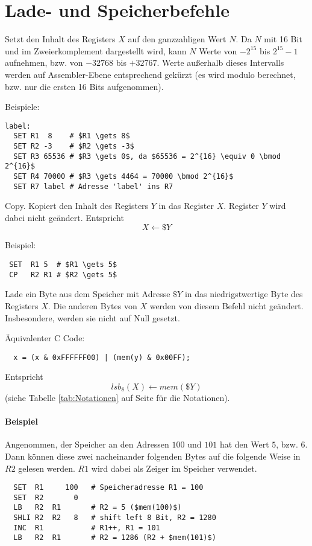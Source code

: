 \section{Lade- und Speicherbefehle}
\label{sec:Lade-Speicher-Instruktionen}

Setzt den Inhalt des Registers $X$ auf den ganzzahligen Wert $N$.
Da $N$ mit 16 Bit und im Zweierkomplement dargestellt wird, kann $N$ Werte von
$-2^{15}$ bis $2^{15} - 1$ aufnehmen, bzw. von $-32768$ bis $+32767$.
Werte außerhalb dieses Intervalls werden auf Assembler-Ebene entsprechend
gekürzt (es wird modulo berechnet, bzw. nur die ersten 16 Bits aufgenommen).

Beispiele:
\begin{lstlisting}
label:
  SET R1  8    # $R1 \gets 8$
  SET R2 -3    # $R2 \gets -3$
  SET R3 65536 # $R3 \gets 0$, da $65536 = 2^{16} \equiv 0 \bmod 2^{16}$
  SET R4 70000 # $R3 \gets 4464 = 70000 \bmod 2^{16}$
  SET R7 label # Adresse 'label' ins R7
\end{lstlisting}


\glqq Copy\grqq.
Kopiert den Inhalt des Registers $Y$ in das Register $X$. Register $Y$ wird
dabei nicht geändert. Entspricht
\[
    X \gets \$Y
\]

Beispiel:
\begin{lstlisting}
 SET  R1 5  # $R1 \gets 5$
 CP   R2 R1 # $R2 \gets 5$
\end{lstlisting}



Lade ein Byte aus dem Speicher mit Adresse $\$Y$ in das niedrigstwertige
Byte des Registers $X$. Die anderen Bytes von $X$ werden von diesem Befehl nicht
geändert. Insbesondere, werden sie nicht auf Null gesetzt.

Äquivalenter C Code:
\begin{lstlisting}
  x = (x & 0xFFFFFF00) | (mem(y) & 0x00FF);
\end{lstlisting}

Entspricht 
\[
  lsb_{8}(X) \gets mem(\$Y)
\]
(siehe Tabelle \ref{tab:Notationen} auf Seite \pageref{tab:Notationen} für die
Notationen).

\paragraph{Beispiel}
Angenommen, der Speicher an den Adressen $100$ und $101$ hat den Wert $5$, bzw.
$6$. Dann können diese zwei nacheinander folgenden Bytes auf die
folgende Weise in $R2$ gelesen werden. $R1$ wird dabei als Zeiger im Speicher
verwendet.
\begin{lstlisting}
  SET  R1     100   # Speicheradresse R1 = 100
  SET  R2       0
  LB   R2  R1       # R2 = 5 ($mem(100)$)
  SHLI R2  R2   8   # shift left 8 Bit, R2 = 1280
  INC  R1           # R1++, R1 = 101
  LB   R2  R1       # R2 = 1286 (R2 + $mem(101)$)
\end{lstlisting}




